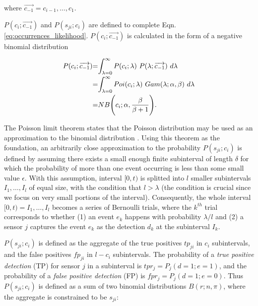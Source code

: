 \noindent where $\overrightarrow{c_{-1}} = c_{i-1}, \ldots, c_1$.

$P(c_i ; \overrightarrow{c_{-1}})$ and $P(s_{ji} ; c_i)$ are defined to complete Eqn. \ref{eq:occurrences_likelihood}. $P(c_i ; \overrightarrow{c_{-1}})$ is calculated in the form of a negative binomial distribution

\begin{equation}
	\label{eq:unconditional_xi}
	\begin{tabular}{r@{=}l}
		$P(c_i ; \overrightarrow{c_{-1}})$ & $\displaystyle\int_{\lambda=0}^{\infty} P(c_i ; \lambda) ~ P(\lambda ; \overrightarrow{c_{-1}}) ~d\lambda$ \\ [2ex]
		& $\displaystyle\int_{\lambda=0}^{\infty} Poi(c_i ; \lambda) ~ Gam(\lambda ; \alpha, \beta) ~d\lambda$ \\ [2ex]
		& $NB\Bigg(c_i ; \alpha, \displaystyle\frac{\beta}{\beta + 1}\Bigg)$.
	\end{tabular}
\end{equation}

The Poisson limit theorem states that the Poisson distribution may be used as an approximation to the binomial distribution \cite{papoulis2002probability}. Using this theorem as the foundation, an arbitrarily close approximation to the probability $P(s_{ji} ; c_i)$ is defined by assuming there exists a small enough finite subinterval of length $\delta$ for which the probability of more than one event occurring is less than some small value $ \epsilon$. With this assumption, interval $[0, t)$ is splitted into $l$ smaller subintervals $I_1, \ldots, I_l$ of equal size, with the condition that $l > \lambda$ (the condition is crucial since we focus on very small portions of the interval). Consequently, the whole interval $[0, t) = I_1, \ldots, I_l$ becomes a series of Bernoulli trials, where the $k^{th}$ trial corresponds to whether (1) an event $e_k$ happens with probability $\lambda / l$ and (2) a sensor $j$ captures the event $e_k$ as the detection $d_k$ at the subinterval $I_k$.

$P(s_{ji} ; c_i)$ is defined as the aggregate of the true positives $tp_{ji}$ in $c_i$ subintervals, and the false positives $fp_{ji}$ in $l-c_i$ subintervals. The probability of a \textit{true positive detection} (TP) for sensor $j$ in a subinterval is $tpr_j = P_j(d = 1 ; e=1)$, and the probability of a \textit{false positive detection} (FP) is $fpr_j = P_j(d = 1 ; e=0)$. Thus $P(s_{ji} ; c_i)$ is defined as a sum of two binomial distributions $B(r ; n,\pi)$, where the aggregate is constrained to be $s_{ji}$: 

